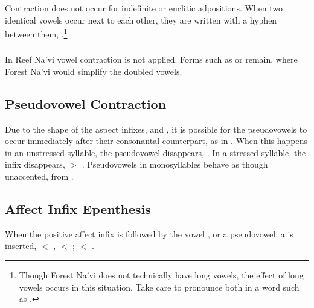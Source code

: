 \subsubsection{} Contraction does not occur for indefinite  or
enclitic adpositions.  When two identical vowels occur next to each
other, they are written with a hyphen between them, 
  .\footnote{Though Forest
Na'vi does not technically have long vowels, the effect of long vowels
occurs in this situation.  Take care to pronounce both  in a word
such as .}

\subsubsection{} In Reef Na'vi vowel contraction is not applied.
Forms such as  or  remain, where Forest Na'vi
would simplify the doubled vowels.
\label{rn:no-contract}

\subsection{Pseudovowel Contraction} Due to the shape of the aspect
infixes,  and , it is possible for the
pseudovowels to occur immediately after their consonantal counterpart,
as in .  When this happens in an unstressed
syllable, the pseudovowel disappears, .  In a
stressed syllable, the infix disappears,  $>$
.  Pseudovowels in monosyllables behave as though
unaccented,  from . 

\subsection{Affect Infix Epenthesis} When the positive affect infix
 is followed by the vowel ,  or a pseudovowel, a
 is inserted,  $<$ ,  $<$
;  $<$ .
\label{l-and-s:eiy-epenth}

